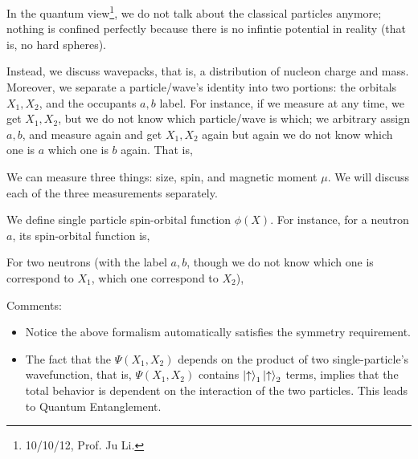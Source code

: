 \documentclass{school-22.101-notes}
\date{October 14, 2011}
\begin{document}
\maketitle

In the quantum view\footnote{10/10/12, Prof. Ju Li.}, we do not talk about the classical particles anymore; nothing is confined perfectly because there is no infintie potential in reality (that is, no hard spheres). 

Instead, we discuss wavepacks, that is, a distribution of nucleon charge and mass. Moreover, we separate a particle/wave's identity into two portions: the orbitals $X_1, X_2$, and the occupants $a,b$ label. For instance, if we measure at any time, we get $X_1, X_2$, but we do not know which particle/wave is which; we arbitrary assign $a,b$, and measure again and get $X_1, X_2$ again but again we do not know which one is $a$ which one is $b$ again. That is, 

We can measure three things: size, spin, and magnetic moment $\mu$. We will discuss each of the three measurements separately. 


We define single particle spin-orbital function $\phi(X)$. For instance, for a neutron $a$, its spin-orbital function is, 

For two neutrons (with the label $a,b$, though we do not know which one is correspond to $X_1$, which one correspond to $X_2$), 

Comments: 
\begin{itemize}
\item Notice the above formalism automatically satisfies the symmetry requirement. 
\item The fact that the $\Psi(X_1, X_2)$ depends on the product of two single-particle's wavefunction, that is, $\Psi(X_1, X_2)$ contains $\left| \uparrow \right>_1 \left| \uparrow \right>_2$ terms, implies that the total behavior is dependent on the interaction of the two particles. This leads to Quantum Entanglement. 
\end{itemize}
\end{document}
